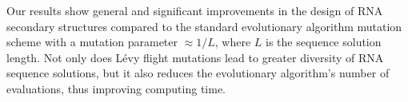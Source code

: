 Our results show general and significant improvements in the design of RNA secondary structures compared to the standard evolutionary algorithm mutation scheme with a mutation parameter $\approx 1/L$, where $L$ is the sequence solution length. Not only does Lévy flight mutations lead to greater diversity of RNA sequence solutions, but it also reduces the evolutionary algorithm’s number of evaluations, thus improving computing time. 
